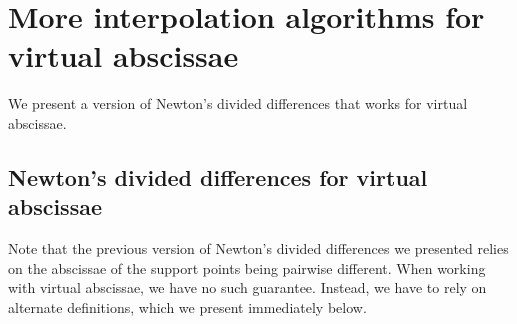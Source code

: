 
\section{More interpolation algorithms for virtual abscissae}

We present a version of Newton's divided differences that works for virtual abscissae.
\subsection{Newton's divided differences for virtual abscissae}

Note that the previous version of Newton's divided differences we presented relies on the abscissae of the support points being pairwise different. When working with virtual abscissae, we have no such guarantee. Instead, we have to rely on alternate definitions, which we present immediately below.

